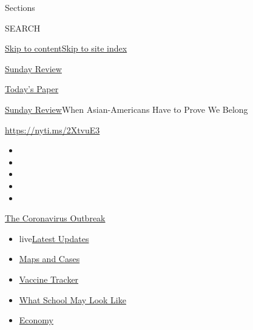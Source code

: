 Sections

SEARCH

\protect\hyperlink{site-content}{Skip to
content}\protect\hyperlink{site-index}{Skip to site index}

\href{https://www.nytimes.com/section/opinion/sunday}{Sunday Review}

\href{https://myaccount.nytimes.com/auth/login?response_type=cookie\&client_id=vi}{}

\href{https://www.nytimes.com/section/todayspaper}{Today's Paper}

\href{/section/opinion/sunday}{Sunday Review}\textbar{}When
Asian-Americans Have to Prove We Belong

\url{https://nyti.ms/2XtvuE3}

\begin{itemize}
\item
\item
\item
\item
\item
\end{itemize}

\href{https://www.nytimes.com/news-event/coronavirus?action=click\&pgtype=Article\&state=default\&region=TOP_BANNER\&context=storylines_menu}{The
Coronavirus Outbreak}

\begin{itemize}
\tightlist
\item
  live\href{https://www.nytimes.com/2020/08/01/world/coronavirus-covid-19.html?action=click\&pgtype=Article\&state=default\&region=TOP_BANNER\&context=storylines_menu}{Latest
  Updates}
\item
  \href{https://www.nytimes.com/interactive/2020/us/coronavirus-us-cases.html?action=click\&pgtype=Article\&state=default\&region=TOP_BANNER\&context=storylines_menu}{Maps
  and Cases}
\item
  \href{https://www.nytimes.com/interactive/2020/science/coronavirus-vaccine-tracker.html?action=click\&pgtype=Article\&state=default\&region=TOP_BANNER\&context=storylines_menu}{Vaccine
  Tracker}
\item
  \href{https://www.nytimes.com/interactive/2020/07/29/us/schools-reopening-coronavirus.html?action=click\&pgtype=Article\&state=default\&region=TOP_BANNER\&context=storylines_menu}{What
  School May Look Like}
\item
  \href{https://www.nytimes.com/live/2020/07/31/business/stock-market-today-coronavirus?action=click\&pgtype=Article\&state=default\&region=TOP_BANNER\&context=storylines_menu}{Economy}
\end{itemize}

